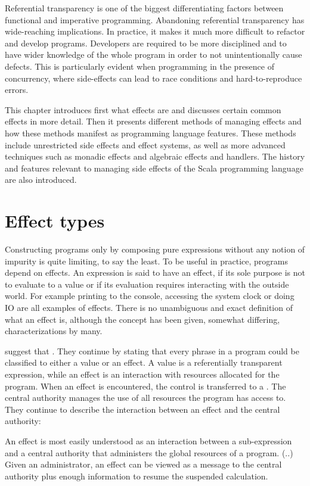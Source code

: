 Referential transparency is one of the biggest differentiating factors between functional and imperative programming. Abandoning referential transparency has wide-reaching implications. In practice, it makes it much more difficult to refactor and develop programs. Developers are required to be more disciplined and to have wider knowledge of the whole program in order to not unintentionally cause defects. This is particularly evident when programming in the presence of concurrency, where side-effects can lead to race conditions and hard-to-reproduce errors.~\cite[Chapter~3]{sicp}

This chapter introduces first what effects are and discusses certain common effects in more detail. Then it presents different methods of managing effects and how these methods manifest as programming language features.  These methods include unrestricted side effects and effect systems, as well as more advanced techniques such as monadic effects and algebraic effects and handlers. The history and features relevant to managing side effects of the Scala programming language are also introduced.


\section{Effect types} \label{effect-types}
Constructing programs only by composing pure expressions without any notion of impurity is quite limiting, to say the least. To be useful in practice, programs depend on effects. An expression is said to have an effect, if its sole purpose is not to evaluate to a value or if its evaluation requires interacting with the outside world. For example printing to the console, accessing the system clock or doing IO are all examples of effects. There is no unambiguous and exact definition of what an effect is, although the concept has been given, somewhat differing, characterizations by many.

\textcite{den-lang-specs} suggest that . They continue by stating that every phrase in a program could be classified to either a value or an effect. A value is a referentially transparent expression, while an effect is an interaction with resources allocated for the program. When an effect is encountered, the control is transferred to a . The central authority manages the use of all resources the program has access to. They continue to describe the interaction between an effect and the central authority:
\begin{displayquote}
An effect is most easily understood as an interaction between a sub-expression
and a central authority that administers the global resources of a program. (..) Given an administrator, an effect can be viewed as a message to the central authority plus enough information to resume the suspended calculation.
\end{displayquote}

